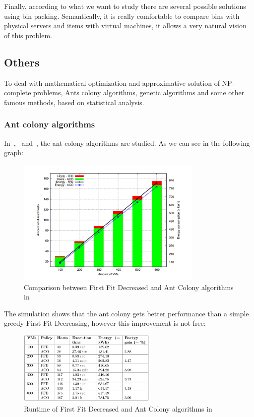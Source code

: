Finally, according to what we want to study there are several possible solutions using
bin packing. Semantically, it is really comfortable to compare bins with physical servers
and items with virtual machines, it allows a very natural vision of this problem.

\subsection{Others}

To deal with mathematical optimization and approximative solution of NP-complete problems,
Ants colony algorithms, genetic algorithms and some other famous methods, based on statistical
analysis.

\subsubsection{Ant colony algorithms}

In~\cite{algoAntcolony1},~\cite{algoAntcolony2} and~\cite{algoAntcolony3}, the ant colony
algorithms are studied. As we can see in the following graph:

\begin{figure}[H]
\begin{center}
	\includegraphics[width=0.8\textwidth]{./Images/antcolonyperf.png}
	\caption{Comparison between First Fit Decreased and Ant Colony algorithms in~\cite{algoAntcolony2}}
\end{center}
\end{figure}

The simulation shows that the ant colony gets better performance than a simple greedy First
Fit Decreasing, however this improvement is not free:

\begin{figure}[H]
\begin{center}
	\includegraphics[width=0.6\textwidth]{./Images/antcolonyruntime.png}
	\caption{Runtime of First Fit Decreased and Ant Colony algorithms in~\cite{algoAntcolony2}}
\end{center}
\end{figure}

